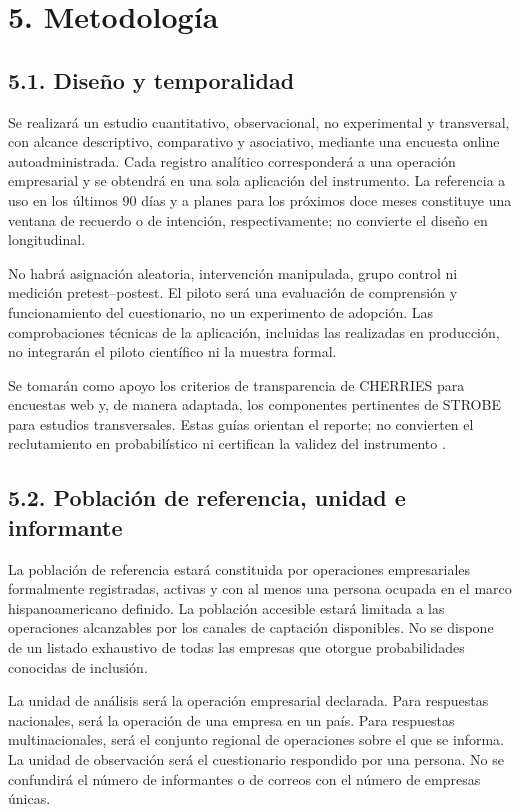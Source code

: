 \documentclass[12pt,letterpaper]{article}
\begin{document}
\section*{5. Metodología}
\subsection*{5.1. Diseño y temporalidad}
Se realizará un estudio cuantitativo, observacional, no experimental y transversal, con alcance descriptivo, comparativo y asociativo, mediante una encuesta online autoadministrada. Cada registro analítico corresponderá a una operación empresarial y se obtendrá en una sola aplicación del instrumento. La referencia a uso en los últimos 90 días y a planes para los próximos doce meses constituye una ventana de recuerdo o de intención, respectivamente; no convierte el diseño en longitudinal.

No habrá asignación aleatoria, intervención manipulada, grupo control ni medición pretest--postest. El piloto será una evaluación de comprensión y funcionamiento del cuestionario, no un experimento de adopción. Las comprobaciones técnicas de la aplicación, incluidas las realizadas en producción, no integrarán el piloto científico ni la muestra formal.

Se tomarán como apoyo los criterios de transparencia de CHERRIES para encuestas web y, de manera adaptada, los componentes pertinentes de STROBE para estudios transversales. Estas guías orientan el reporte; no convierten el reclutamiento en probabilístico ni certifican la validez del instrumento \citep{eysenbach,strobe}.

\subsection*{5.2. Población de referencia, unidad e informante}
La población de referencia estará constituida por operaciones empresariales formalmente registradas, activas y con al menos una persona ocupada en el marco hispanoamericano definido. La población accesible estará limitada a las operaciones alcanzables por los canales de captación disponibles. No se dispone de un listado exhaustivo de todas las empresas que otorgue probabilidades conocidas de inclusión.

La unidad de análisis será la operación empresarial declarada. Para respuestas nacionales, será la operación de una empresa en un país. Para respuestas multinacionales, será el conjunto regional de operaciones sobre el que se informa. La unidad de observación será el cuestionario respondido por una persona. No se confundirá el número de informantes o de correos con el número de empresas únicas.
\end{document}
